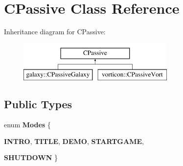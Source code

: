 \hypertarget{class_c_passive}{
\section{CPassive Class Reference}
\label{class_c_passive}
}
Inheritance diagram for CPassive:\begin{figure}[H]
\begin{center}
\leavevmode
\includegraphics[height=2cm]{class_c_passive}
\end{center}
\end{figure}
\subsection*{Public Types}
\begin{DoxyCompactItemize}
\item 
enum {\bfseries Modes} \{ \par
{\bfseries INTRO}, 
{\bfseries TITLE}, 
{\bfseries DEMO}, 
{\bfseries STARTGAME}, 
\par
{\bfseries SHUTDOWN}
 \}
\end{DoxyCompactItemize}
